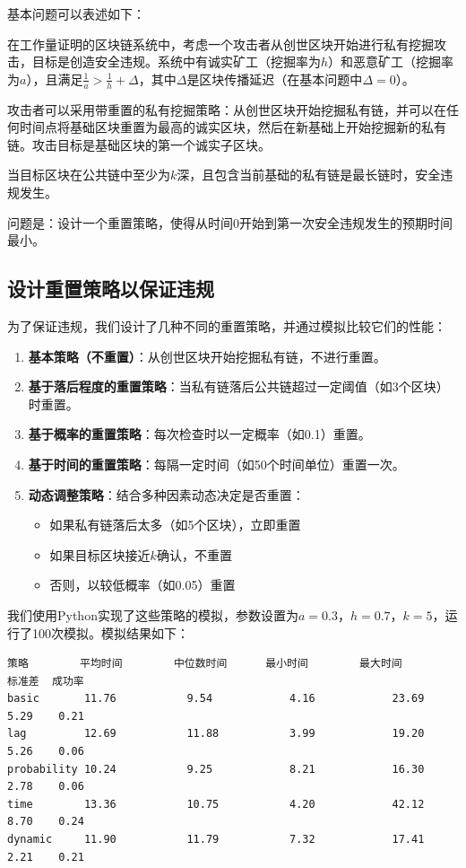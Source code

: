 \documentclass[12pt,a4paper]{article}
\begin{document}
\begin{CJK}{UTF8}{gbsn}
基本问题可以表述如下：

在工作量证明的区块链系统中，考虑一个攻击者从创世区块开始进行私有挖掘攻击，目标是创造安全违规。系统中有诚实矿工（挖掘率为$h$）和恶意矿工（挖掘率为$a$），且满足$\frac{1}{a} > \frac{1}{h} + \Delta$，其中$\Delta$是区块传播延迟（在基本问题中$\Delta = 0$）。

攻击者可以采用带重置的私有挖掘策略：从创世区块开始挖掘私有链，并可以在任何时间点将基础区块重置为最高的诚实区块，然后在新基础上开始挖掘新的私有链。攻击目标是基础区块的第一个诚实子区块。

当目标区块在公共链中至少为$k$深，且包含当前基础的私有链是最长链时，安全违规发生。

问题是：设计一个重置策略，使得从时间0开始到第一次安全违规发生的预期时间最小。

\subsection{设计重置策略以保证违规}

为了保证违规，我们设计了几种不同的重置策略，并通过模拟比较它们的性能：

\begin{enumerate}
    \item \textbf{基本策略（不重置）}：从创世区块开始挖掘私有链，不进行重置。
    \item \textbf{基于落后程度的重置策略}：当私有链落后公共链超过一定阈值（如3个区块）时重置。
    \item \textbf{基于概率的重置策略}：每次检查时以一定概率（如0.1）重置。
    \item \textbf{基于时间的重置策略}：每隔一定时间（如50个时间单位）重置一次。
    \item \textbf{动态调整策略}：结合多种因素动态决定是否重置：
        \begin{itemize}
            \item 如果私有链落后太多（如5个区块），立即重置
            \item 如果目标区块接近$k$确认，不重置
            \item 否则，以较低概率（如0.05）重置
        \end{itemize}
\end{enumerate}

我们使用Python实现了这些策略的模拟，参数设置为$a = 0.3$，$h = 0.7$，$k = 5$，运行了100次模拟。模拟结果如下：

\begin{verbatim}
策略        平均时间        中位数时间      最小时间        最大时间        标准差  成功率
basic       11.76           9.54            4.16            23.69           5.29    0.21
lag         12.69           11.88           3.99            19.20           5.26    0.06
probability 10.24           9.25            8.21            16.30           2.78    0.06
time        13.36           10.75           4.20            42.12           8.70    0.24
dynamic     11.90           11.79           7.32            17.41           2.21    0.21
\end{verbatim}


\end{CJK}
\end{document}
